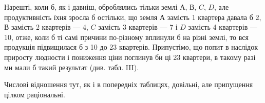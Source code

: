 Нарешті, коли б, як і давніш, оброблялись тільки землі $А$, $В$, $C$, $D$, але продуктивність їхня зросла б
остільки, що земля $А$ замість 1 квартера давала б 2, $В$ замість 2 квартерів — 4,
$C$ замість 3 квартерів — 7 і $D$ замість 4 квартерів — 10, отже, коли б ті самі
причини по-різному вплинули б на різні землі, то вся продукція підвищилася
б з 10 до 23 квартерів. Припустімо, що попит в наслідок приросту
людности і пониження ціни поглинув би ці 23 квартери, в такому разі ми
мали б такий результат (див. табл. III).

Числові відношення тут, як і в попередніх таблицях, довільні, але припущення
цілком раціональні.
